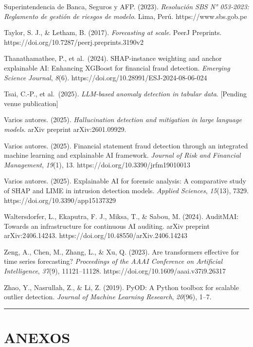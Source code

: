 Superintendencia de Banca, Seguros y AFP. (2023). \emph{Resolución SBS
N° 053-2023: Reglamento de gestión de riesgos de modelo}. Lima, Perú.
https://www.sbs.gob.pe

Taylor, S. J., \& Letham, B. (2017). \emph{Forecasting at scale}. PeerJ
Preprints. https://doi.org/10.7287/peerj.preprints.3190v2

Thanathamathee, P., et al.~(2024). SHAP-instance weighting and anchor
explainable AI: Enhancing XGBoost for financial fraud detection.
\emph{Emerging Science Journal}, \emph{8}(6).
https://doi.org/10.28991/ESJ-2024-08-06-024

Tsai, C.-P., et al.~(2025). \emph{LLM-based anomaly detection in tabular
data}. {[}Pending venue publication{]}

Varios autores. (2025). \emph{Hallucination detection and mitigation in
large language models}. arXiv preprint arXiv:2601.09929.

Varios autores. (2025). Financial statement fraud detection through an
integrated machine learning and explainable AI framework. \emph{Journal
of Risk and Financial Management}, \emph{19}(1), 13.
https://doi.org/10.3390/jrfm19010013

Varios autores. (2025). Explainable AI for forensic analysis: A
comparative study of SHAP and LIME in intrusion detection models.
\emph{Applied Sciences}, \emph{15}(13), 7329.
https://doi.org/10.3390/app15137329

Waltersdorfer, L., Ekaputra, F. J., Miksa, T., \& Sabou, M. (2024).
AuditMAI: Towards an infrastructure for continuous AI auditing. arXiv
preprint arXiv:2406.14243. https://doi.org/10.48550/arXiv.2406.14243

Zeng, A., Chen, M., Zhang, L., \& Xu, Q. (2023). Are transformers
effective for time series forecasting? \emph{Proceedings of the AAAI
Conference on Artificial Intelligence}, \emph{37}(9), 11121--11128.
https://doi.org/10.1609/aaai.v37i9.26317

Zhao, Y., Nasrullah, Z., \& Li, Z. (2019). PyOD: A Python toolbox for
scalable outlier detection. \emph{Journal of Machine Learning Research},
\emph{20}(96), 1--7.

\begin{center}\rule{0.5\linewidth}{0.5pt}\end{center}

\section{ANEXOS}\label{anexos}

